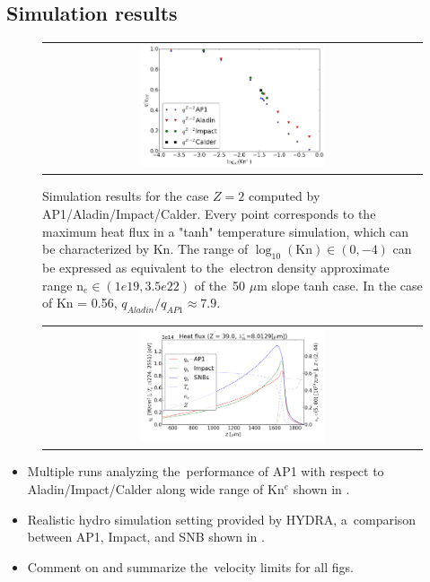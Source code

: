 \subsection{Simulation results}
\label{sec:SimulationResults}

\begin{figure}[tbh]
  \begin{center}
    \begin{tabular}{c}
      \includegraphics[width=0.5\textwidth]{Kn_results.png}
    \end{tabular}
  \caption{  
  Simulation results for the case $Z=2$ computed by AP1/Aladin/Impact/Calder.
  Every point corresponds to the maximum heat flux in a "tanh" temperature 
  simulation, which can be characterized by Kn. The range of 
  $\log_{10}(\text{Kn})\in (0, -4)$ can be expressed as equivalent 
  to the~electron density approximate range n$_e \in (1e19, 3.5e22)$ of 
  the~50 $\mu$m slope tanh case. In the case of Kn = 0.56, 
  $q_{Aladin} / q_{AP1}\approx 7.9$.}
  \label{fig:Kn_results}
  \end{center} 
\end{figure}

\begin{figure}[tbh]
  \begin{center}
    \begin{tabular}{c}
      \includegraphics[width=0.5\textwidth]{../VFPdata/GD_Hohlraum/fluxes_10ps.png} 
    \end{tabular}
  \caption{
  }
  \label{fig:Gd_VFP_10ps_heatflux}
  \end{center} 
\end{figure}

\begin{itemize}
  \item Multiple runs analyzing the~performance of AP1 with respect to 
    Aladin/Impact/Calder along wide range of Kn$^e$ shown in 
    .
  \item Realistic hydro simulation setting provided by HYDRA, a~comparison
    between AP1, Impact, and SNB shown in .
  \item Comment on and summarize the~velocity limits for all figs.
\end{itemize}

